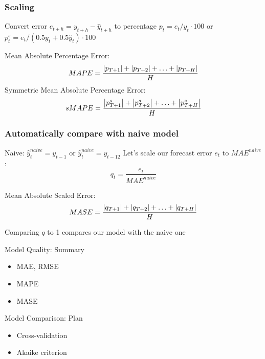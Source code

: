 \begin{frame}
	\frametitle{Scaling}
	
	Convert error $e_{t+h} = y_{t+h} - \hat y_{t+h}$ \alert{to percentage} $p_t= e_t/y_t \cdot 100$ or
	$p^s_t = e_t/(0.5 y_t + 0.5\hat y_t) \cdot 100$
	
	\pause
	\alert{Mean Absolute Percentage Error}:
	\[
	MAPE = \frac{\abs {p_{T+1}} + \abs{p_{T+2}}+ \ldots + \abs{p_{T+H}} }{H}
	\]
	\pause
	\alert{Symmetric Mean Absolute Percentage Error}:
	\[
	sMAPE = \frac{\abs {p^s_{T+1}} + \abs{p^s_{T+2}}+ \ldots + \abs{p^s_{T+H}} }{H} 
	\]
	
\end{frame}

\begin{frame}
	\frametitle{Automatically compare with naive model}
	
	\alert{Naive}: $\hat y^{naive}_t = y_{t-1}$ or $\hat y^{naive}_t = y_{t-12}$
	\pause
	Let's scale our forecast error $e_t$ to $MAE^{naive}$:
	\[
	q_t = \frac{e_t}{MAE^{naive}}
	\]
	
	\pause
	\alert{Mean Absolute Scaled Error}:
	\[
	MASE = \frac{\abs {q_{T+1}} + \abs{q_{T+2}}+ \ldots + \abs{q_{T+H}} }{H}
	\]
	
	\pause
	Comparing $q$ to 1 compares our model with the naive one
	
	
\end{frame}



\begin{frame}{Model Quality: Summary}
	
	\begin{itemize}[<+->]
		\item MAE, RMSE
		\item MAPE
		\item MASE
	\end{itemize}
\end{frame}




\begin{frame} %
	
	
\end{frame}



\begin{frame}{Model Comparison: Plan}
	\begin{itemize}[<+->]
		\item Cross-validation
		\item Akaike criterion
	\end{itemize}
	
\end{frame}




